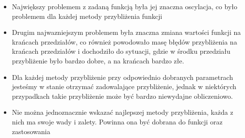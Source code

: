\documentclass{article}
\begin{document}
\begin{itemize}
    \item Największy problemem z zadaną funkcją była jej znaczna oscylacja, co było problemem dla każdej metody przybliżenia funkcji
    \item Drugim najwazniejszym problemem była znaczna zmiana wartości funkcji na krańcach przedziałów, co również powodowało masę błędów przybliżenia na krańcach przedziałów i dochodziło do sytuacji, gdzie w środku przedziału przybliżenie było bardzo dobre, a na krańcach bardzo złe.
    \item Dla każdej metody przybliżenie przy odpowiednio dobranych parametrach jesteśmy w stanie otrzymać zadowalające przybliżenie, jednak w niektórych przypadkach takie przybliżenie może być bardzo niewydajne obliczeniowo.
    \item Nie można jednoznacznie wskazać najlepszej metody przybliżenia, każda z nich ma swoje wady i zalety. Powinna ona  być dobrana do funkcji oraz zastosowania
\end{itemize}
\end{document}
